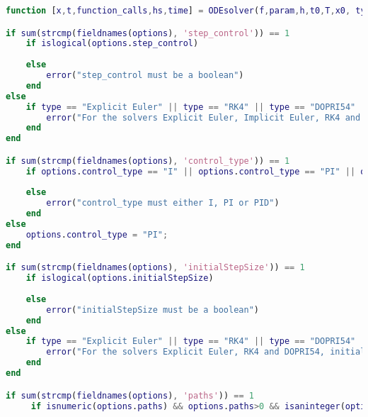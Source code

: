 \begin{lstlisting}[language=Matlab,caption=ODEsolver wrapper,label=lst0:wrapper]
function [x,t,function_calls,hs,time] = ODEsolver(f,param,h,t0,T,x0, type,options)

if sum(strcmp(fieldnames(options), 'step_control')) == 1
    if islogical(options.step_control)
        
    else
        error("step_control must be a boolean")
    end
else
    if type == "Explicit Euler" || type == "RK4" || type == "DOPRI54" || type == "Implicit Euler"
        error("For the solvers Explicit Euler, Implicit Euler, RK4 and DOPRI54, step_control must be defined")   
    end
end

if sum(strcmp(fieldnames(options), 'control_type')) == 1
    if options.control_type == "I" || options.control_type == "PI" || options.control_type == "PID"
        
    else
        error("control_type must either I, PI or PID")
    end
else 
    options.control_type = "PI";
end

if sum(strcmp(fieldnames(options), 'initialStepSize')) == 1
    if islogical(options.initialStepSize)
        
    else
        error("initialStepSize must be a boolean")
    end
else
    if type == "Explicit Euler" || type == "RK4" || type == "DOPRI54"
        error("For the solvers Explicit Euler, RK4 and DOPRI54, initialStepSize must be defined")   
    end
end

if sum(strcmp(fieldnames(options), 'paths')) == 1
     if isnumeric(options.paths) && options.paths>0 && isaninteger(options.paths)
         

\end{lstlisting}
